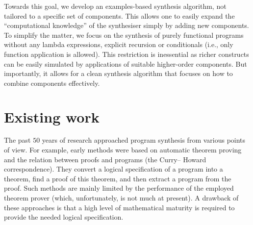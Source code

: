 Towards this goal, we develop an examples-based synthesis algorithm, not tailored to a specific set of components.  This allows one to easily expand the ``computational knowledge'' of the synthesiser simply by adding new components.  To simplify the matter, we focus on the synthesis of purely functional programs without any lambda expressions, explicit recursion or conditionals (i.e., only function application is allowed).  This restriction is inessential as richer constructs can be easily simulated by applications of suitable higher-order components.  But importantly, it allows for a clean synthesis algorithm that focuses on how to combine components effectively.


\section{Existing work}\label{Background}
The past $50$ years of research approached program synthesis from various points of view.  For example, early methods \cite{Manna:1980:DAP:357084.357090} were based on automatic theorem proving and the relation between proofs and programs (the Curry– Howard correspondence).  They convert a logical specification of a program into a theorem, find a proof of this theorem, and then extract a program from the proof.  Such methods are mainly limited by the performance of the employed theorem prover (which, unfortunately, is not much at present).  A drawback of these approaches is that a high level of mathematical maturity is required to provide the needed logical specification.

